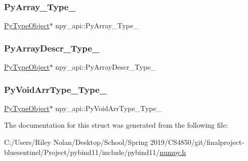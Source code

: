 \mbox{\label{structnpy__api_a90606f7c6be32c8206dc496d8925d984}} 
\subsubsection{\texorpdfstring{PyArray\_Type\_}{PyArray\_Type\_}}
{\footnotesize\ttfamily \mbox{\hyperlink{_python27_2object_8h_a42a55dd6e973872c7a6bc61632070f6f}{Py\+Type\+Object}}$\ast$ npy\+\_\+api\+::\+Py\+Array\+\_\+\+Type\+\_\+}

\mbox{\label{structnpy__api_a098d32c95003331ae8cf6c968163153a}} 
\subsubsection{\texorpdfstring{PyArrayDescr\_Type\_}{PyArrayDescr\_Type\_}}
{\footnotesize\ttfamily \mbox{\hyperlink{_python27_2object_8h_a42a55dd6e973872c7a6bc61632070f6f}{Py\+Type\+Object}}$\ast$ npy\+\_\+api\+::\+Py\+Array\+Descr\+\_\+\+Type\+\_\+}

\mbox{\label{structnpy__api_a00960472c4802c69109ddfa9bb54fca5}} 
\subsubsection{\texorpdfstring{PyVoidArrType\_Type\_}{PyVoidArrType\_Type\_}}
{\footnotesize\ttfamily \mbox{\hyperlink{_python27_2object_8h_a42a55dd6e973872c7a6bc61632070f6f}{Py\+Type\+Object}}$\ast$ npy\+\_\+api\+::\+Py\+Void\+Arr\+Type\+\_\+\+Type\+\_\+}



The documentation for this struct was generated from the following file\+:\begin{DoxyCompactItemize}
\item 
C\+:/\+Users/\+Riley Nolan/\+Desktop/\+School/\+Spring 2019/\+C\+S4850/git/finalproject-\/bluesentinel/\+Project/pybind11/include/pybind11/\mbox{\hyperlink{numpy_8h}{numpy.\+h}}\end{DoxyCompactItemize}
